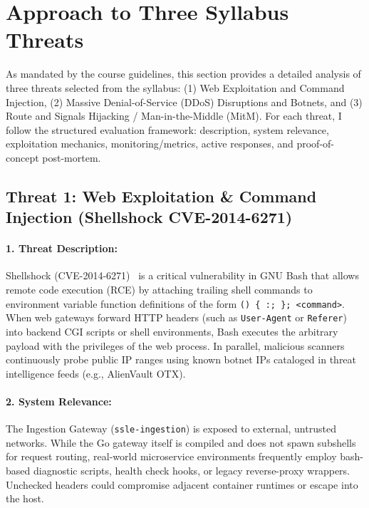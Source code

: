 \section{Approach to Three Syllabus Threats}
\label{sec:three_threats}

As mandated by the course guidelines, this section provides a detailed analysis of three threats selected from the syllabus: (1) Web Exploitation and Command Injection, (2) Massive Denial-of-Service (DDoS) Disruptions and Botnets, and (3) Route and Signals Hijacking / Man-in-the-Middle (MitM). For each threat, I follow the structured evaluation framework: description, system relevance, exploitation mechanics, monitoring/metrics, active responses, and proof-of-concept post-mortem.

\subsection{Threat 1: Web Exploitation \& Command Injection (Shellshock CVE-2014-6271)}
\label{sec:threat1}

\paragraph{1. Threat Description:}
Shellshock (CVE-2014-6271)~\citep{cve20146271} is a critical vulnerability in GNU Bash that allows remote code execution (RCE) by attaching trailing shell commands to environment variable function definitions of the form \texttt{() \{ :; \}; <command>}. When web gateways forward HTTP headers (such as \texttt{User-Agent} or \texttt{Referer}) into backend CGI scripts or shell environments, Bash executes the arbitrary payload with the privileges of the web process. In parallel, malicious scanners continuously probe public IP ranges using known botnet IPs cataloged in threat intelligence feeds (e.g., AlienVault OTX).

\paragraph{2. System Relevance:}
The Ingestion Gateway (\texttt{ssle-ingestion}) is exposed to external, untrusted networks. While the Go gateway itself is compiled and does not spawn subshells for request routing, real-world microservice environments frequently employ bash-based diagnostic scripts, health check hooks, or legacy reverse-proxy wrappers. Unchecked headers could compromise adjacent container runtimes or escape into the host.


